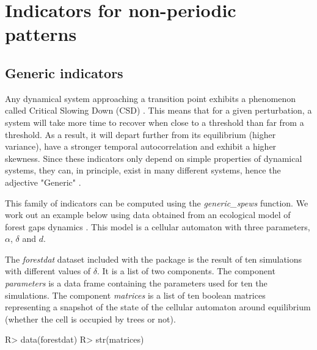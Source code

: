 \documentclass{article}
\begin{document}
\section{Indicators for non-periodic patterns}

  \subsection{Generic indicators}

Any dynamical system approaching a transition point exhibits a phenomenon 
called Critical Slowing Down (CSD) \citep{kefi2013}. This means that for a given
perturbation, a system will take more time to recover when close to a threshold
than far from a threshold. As a result, it will depart further from its 
equilibrium (higher variance), have a stronger temporal autocorrelation and 
exhibit a higher skewness. Since these indicators only depend on simple 
properties of dynamical systems, they can, in principle, exist in many 
different systems, hence the adjective "Generic" \citep{scheffer2012}. 

This family of indicators can be computed using the \emph{generic\_spews} 
function. We work out an example below using data obtained from an ecological
model of forest gaps dynamics \citep{kubo1996}. This model is a cellular 
automaton with three parameters, $\alpha$, $\delta$ and $d$. 

The \emph{forestdat} dataset included with the package is the result of ten 
simulations with different values of $\delta$. It is a list of two components. 
The component \emph{parameters} is a data frame containing the parameters 
used for ten the simulations. The component \emph{matrices} is a list of 
ten boolean matrices representing a snapshot of the state of the cellular 
automaton around equilibrium (whether the cell is occupied by trees or not). 


\begin{Schunk}
\begin{Sinput}
R>   data(forestdat)
R>   str(matrices)
\end{Sinput}
\end{Schunk}

\begin{Schunk}
\end{Schunk}
\end{document}
